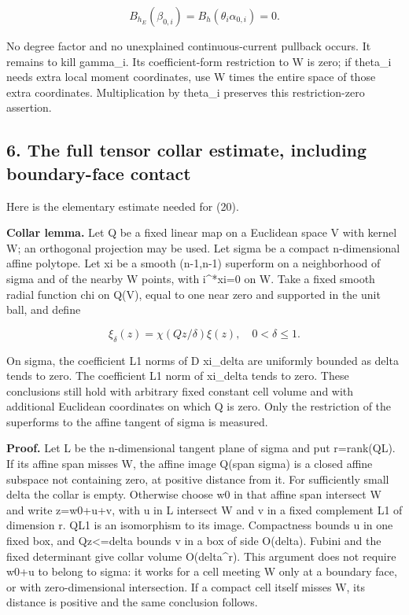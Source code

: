 \documentclass[
  10pt,
]{article}
\begin{document}
\[
 B_{h_E}(\beta_{0,i})=B_h(\theta_i\alpha_{0,i})=0.            \tag{21}
\]

No degree factor and no unexplained continuous-current pullback occurs.
It remains to kill gamma\_i. Its coefficient-form restriction to W is
zero; if theta\_i needs extra local moment coordinates, use W times the
entire space of those extra coordinates. Multiplication by theta\_i
preserves this restriction-zero assertion.

\subsection{6. The full tensor collar estimate, including boundary-face
contact}\label{the-full-tensor-collar-estimate-including-boundary-face-contact}

Here is the elementary estimate needed for (20).

\textbf{Collar lemma.} Let Q be a fixed linear map on a Euclidean space
V with kernel W; an orthogonal projection may be used. Let sigma be a
compact n-dimensional affine polytope. Let xi be a smooth (n-1,n-1)
superform on a neighborhood of sigma and of the nearby W points, with
i\^{}*xi=0 on W. Take a fixed smooth radial function chi on Q(V), equal
to one near zero and supported in the unit ball, and define

\[
 \xi_\delta(z)=\chi(Qz/\delta)\xi(z),\quad 0<\delta\leq1.
\]

On sigma, the coefficient L1 norms of D xi\_delta are uniformly bounded
as delta tends to zero. The coefficient L1 norm of xi\_delta tends to
zero. These conclusions still hold with arbitrary fixed constant cell
volume and with additional Euclidean coordinates on which Q is zero.
Only the restriction of the superforms to the affine tangent of sigma is
measured.

\textbf{Proof.} Let L be the n-dimensional tangent plane of sigma and
put r=rank(Q\textbar L). If its affine span misses W, the affine image
Q(span sigma) is a closed affine subspace not containing zero, at
positive distance from it. For sufficiently small delta the collar is
empty. Otherwise choose w0 in that affine span intersect W and write
z=w0+u+v, with u in L intersect W and v in a fixed complement L1 of
dimension r. Q\textbar L1 is an isomorphism to its image. Compactness
bounds u in one fixed box, and \textbar Qz\textbar\textless=delta bounds
v in a box of side O(delta). Fubini and the fixed determinant give
collar volume O(delta\^{}r). This argument does not require w0+u to
belong to sigma: it works for a cell meeting W only at a boundary face,
or with zero-dimensional intersection. If a compact cell itself misses
W, its distance is positive and the same conclusion follows.
\end{document}
